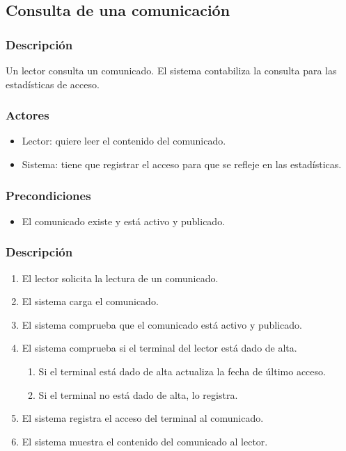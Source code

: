 \subsection{Consulta de una comunicación}

\subsubsection*{Descripción}
Un lector consulta un comunicado. El sistema contabiliza la consulta para las estadísticas de acceso.

\subsubsection*{Actores}
\begin{itemize}
    \item Lector: quiere leer el contenido del comunicado.
    \item Sistema: tiene que registrar el acceso para que se refleje en las estadísticas.
\end{itemize}

\subsubsection*{Precondiciones}
\begin{itemize}
    \item El comunicado existe y está activo y publicado.
\end{itemize}

\subsubsection*{Descripción}

\begin{enumerate}
    \item El lector solicita la lectura de un comunicado.
    \item El sistema carga el comunicado.
    \item El sistema comprueba que el comunicado está activo y publicado.
    \item El sistema comprueba si el terminal del lector está dado de alta.
    \begin{enumerate}
        \item Si el terminal está dado de alta actualiza la fecha de último acceso.
        \item Si el terminal no está dado de alta, lo registra.
    \end{enumerate}
    \item El sistema registra el acceso del terminal al comunicado.
    \item El sistema muestra el contenido del comunicado al lector.
\end{enumerate}

